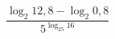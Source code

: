 \begin{ex}
	\begin{condition}
		\( \dfrac{\log_2 12,8-\log_2 0,8}{5^{\log_{25}16}} \)
	\end{condition}
\end{ex}